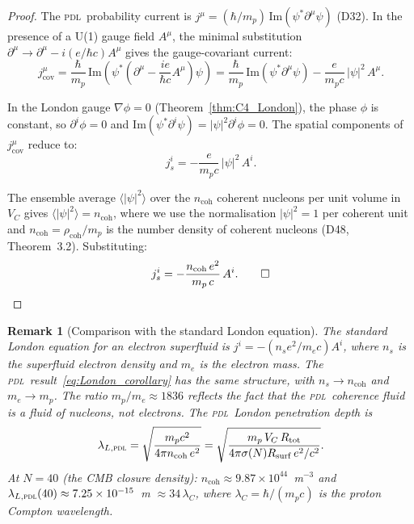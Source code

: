 \documentclass[12pt,a4paper]{article}
\newtheorem{remark}[theorem]{Remark}
\newcommand{\hb}{\hbar}
\newcommand{\PDL}{\textsc{pdl}}
\newcommand{\rhocoh}{\rho_{\mathrm{coh}}}
\newcommand{\Rsurf}{R_{\mathrm{surf}}}
\newcommand{\Rtot}{R_{\mathrm{tot}}}
\newcommand{\VC}{V_C}
\newcommand{\sig}{\sigma}
\newcommand{\ncoh}{n_{\mathrm{coh}}}
\begin{document}
\begin{proof}
The \PDL\ probability current is $j^\mu = (\hb/m_p)\,\mathrm{Im}(\psi^*\partial^\mu\psi)$ (D32). In the presence of a U(1) gauge field $A^\mu$, the minimal substitution $\partial^\mu \to \partial^\mu - i(e/\hb c)A^\mu$ gives the gauge-covariant current:
\begin{equation}
j^\mu_{\mathrm{cov}} = \frac{\hb}{m_p}\,\mathrm{Im}\!\left(\psi^*\!\left(\partial^\mu - \frac{ie}{\hb c}A^\mu\right)\!\psi\right) = \frac{\hb}{m_p}\,\mathrm{Im}(\psi^*\partial^\mu\psi) - \frac{e}{m_p c}\,|\psi|^2\,A^\mu.
\label{eq:j_cov}
\end{equation}

In the London gauge $\nabla\phi = 0$ (Theorem~\ref{thm:C4_London}), the phase $\phi$ is constant, so $\partial^i\phi = 0$ and $\mathrm{Im}(\psi^*\partial^i\psi) = |\psi|^2\partial^i\phi = 0$. The spatial components of $j^\mu_{\mathrm{cov}}$ reduce to:
\begin{equation}
j^i_s = -\frac{e}{m_p c}\,|\psi|^2\,A^i.
\label{eq:js_intermediate}
\end{equation}

The ensemble average $\langle|\psi|^2\rangle$ over the $\ncoh$ coherent nucleons per unit volume in $V_C$ gives $\langle|\psi|^2\rangle = \ncoh$, where we use the normalisation $|\psi|^2 = 1$ per coherent unit and $\ncoh = \rhocoh/m_p$ is the number density of coherent nucleons (D48, Theorem~3.2). Substituting:
\begin{equation}
j^i_s = -\frac{\ncoh\,e^2}{m_p\,c}\,A^i. \qed
\end{equation}
\end{proof}

\begin{remark}[Comparison with the standard London equation]
\label{rem:comparison}
The standard London equation for an electron superfluid is $j^i = -(n_s e^2/m_e c)A^i$, where $n_s$ is the superfluid electron density and $m_e$ is the electron mass. The \PDL\ result~\eqref{eq:London_corollary} has the same structure, with $n_s \to \ncoh$ and $m_e \to m_p$. The ratio $m_p/m_e \approx 1836$ reflects the fact that the \PDL\ coherence fluid is a fluid of nucleons, not electrons. The \PDL\ London penetration depth is
\begin{equation}
\lambda_{L,\PDL} = \sqrt{\frac{m_p c^2}{4\pi\ncoh\,e^2}} = \sqrt{\frac{m_p\,\VC\,\Rtot}{4\pi\sig(N)\Rsurf\,e^2/c^2}}.
\label{eq:lambda_L}
\end{equation}
At $N=40$ (the CMB closure density): $\ncoh \approx 9.87\times10^{44}$~m$^{-3}$ and $\lambda_{L,\PDL}(40) \approx 7.25\times10^{-15}$~m $\approx 34\,\lambda_C$, where $\lambda_C = \hb/(m_p c)$ is the proton Compton wavelength.
\end{remark}
\end{document}
